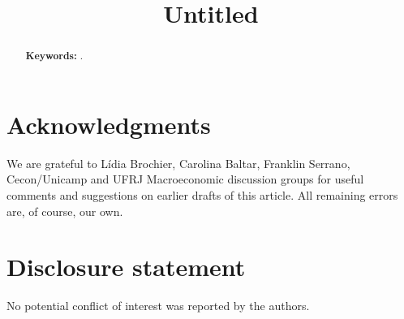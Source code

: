 %


\usepackage{epstopdf}%
\usepackage{graphicx}
\usepackage{multirow}
\usepackage{tablefootnote}
\usepackage{threeparttable}
\usepackage{booktabs}
\usepackage{float}

\usepackage[T1]{fontenc}
\usepackage[utf8]{inputenc}%
\usepackage[american]{babel}
\usepackage{setspace}
\usepackage{amssymb}
\usepackage{amsmath}%
\usepackage{mathptmx}%
\usepackage{url}
\usepackage{caption}
\usepackage{indentfirst}
\usepackage{csquotes}
\usepackage{lipsum}
\usepackage[titletoc,title]{appendix}

\usepackage{tikz}
\usetikzlibrary{through,calc}





\title{Untitled}


	
\maketitle

\begin{abstract}
	\lipsum[3-4]

	\noindent\textbf{Keywords:} .
\end{abstract}




%


\section*{Acknowledgments}

\noindent We are grateful to  Lídia Brochier, Carolina Baltar, Franklin Serrano, Cecon/Unicamp and UFRJ Macroeconomic discussion groups for useful comments and suggestions on earlier drafts of this article. All remaining errors are, of course, our own.

\section*{Disclosure statement}

\noindent No potential conflict of interest was reported by the authors.


\printbibliography{}

\begin{appendix}
	
\end{appendix}

